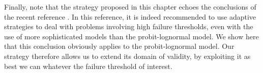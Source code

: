 













{Finally, note that the strategy proposed in this chapter echoes the conclusions of the recent reference \mbox{\cite{zhu_seismic_2023}}. In this reference, it is indeed recommended to use adaptive strategies to deal with problems involving high failure thresholds, even with the use of more sophisticated models than the probit-lognormal model. We show here that this conclusion obviously applies to the probit-lognormal model. Our strategy therefore allows us to extend its domain of validity, by exploiting it as best we can whatever the failure threshold of interest.}



